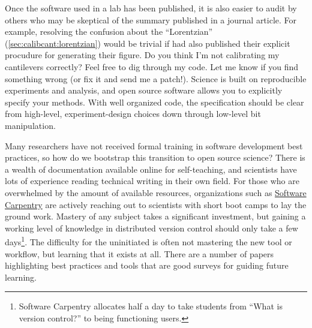 Once the software used in a lab has been published, it is also easier
to audit by others who may be skeptical of the summary published in a
journal article.  For example, resolving the confusion about the
``Lorentzian'' (\cref{sec:calibcant:lorentzian}) would be trivial if
\citet{florin95} had also published their explicit procudure for
generating their figure.  Do you think I'm not calibrating my
cantilevers correctly?  Feel free to dig through my code.  Let me know
if you find something wrong (or fix it and send me a patch!).  Science
is built on reproducible experiments and analysis, and open source
software allows you to explicitly specify your methods.  With well
organized code, the specification should be clear from high-level,
experiment-design choices down through low-level bit manipulation.

Many researchers have not received formal training in software
development best practices, so how do we bootstrap this transition to
open source science?  There is a wealth of documentation available
online for self-teaching, and scientists have lots of experience
reading technical writing in their own field.  For those who are
overwhelmed by the amount of available resources, organizations such
as \href{http://http://software-carpentry.org/}{Software Carpentry}
are actively reaching out to scientists with short boot camps to lay
the ground work.  Mastery of any subject takes a significant
investment, but gaining a working level of knowledge in distributed
version control should only take a few days\footnote{
  Software Carpentry allocates half a day to take students from ``What
  is version control?'' to being functioning  users.
}.  The difficulty for the uninitiated is often not mastering the new
tool or workflow, but learning that it exists at all.  There are a
number of papers highlighting best practices and tools that are good
surveys for guiding future
learning\citep{wilson06a,wilson06b,vandewalle09,aruliah12}.
